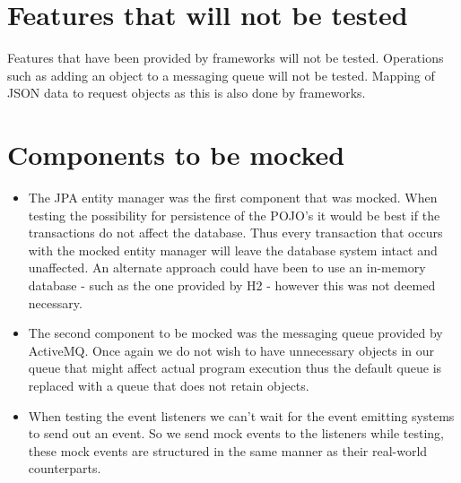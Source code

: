 \documentclass[11pt,a4paper]{article}
\begin{document}
\section{Features that will not be tested}

Features that have been provided by frameworks will not be tested. Operations such as adding an object to a messaging queue will not be tested. Mapping of JSON data to request objects as this is also done by frameworks.

\section{Components to be mocked}
\begin{itemize}
	\item The JPA entity manager was the first component that was mocked. When testing the possibility for persistence of the POJO's it would be best if the transactions do not affect the database. Thus every transaction that occurs with the mocked entity manager will leave the database system intact and unaffected. An alternate approach could have been to use an in-memory database - such as the one provided by H2 - however this was not deemed necessary. \\
	
	\item The second component to be mocked was the messaging queue provided by ActiveMQ. Once again we do not wish to have unnecessary objects in our queue that might affect actual program execution thus the default queue is replaced with a queue that does not retain objects. \\
	
	\item When testing the event listeners we can't wait for the event emitting systems to send out an event. So we send mock events to the listeners while testing, these mock events are structured in the same manner as their real-world counterparts.
\end{itemize}
\end{document}
